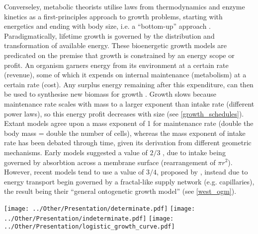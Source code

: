 \documentclass[a4paper]{article} %
\begin{document}
    Converseley, metabolic theorists utilise laws from thermodynamics and enzyme kinetics as a first-principles approach to growth problems, starting with energetics and ending with body size, i.e. a ``bottom-up'' approach \autocite{Brown2004}. Paradigmatically, lifetime growth is governed by the distribution and transformation of available energy. These bioenergetic growth models are predicated on the premise that growth is constrained by an energy scope or profit. An organism garners energy from its environment at a certain rate (revenue), some of which it expends on internal maintenance (metabolism) at a certain rate (cost). Any surplus energy remaining after this expenditure, can then be used to synthesise new biomass for growth \autocite{Holdway1984, Rochet2001}. Growth slows because maintenance rate scales with mass to a larger exponent than intake rate (different power laws), so this energy profit decreases with size (see \cref{growth_schedules}). Extant models agree upon a mass exponent of 1 for maintenance rate (double the body mass = double the number of cells), whereas the mass exponent of intake rate has been debated through time, given its derivation from different geometric mechanisms. Early models suggested a value of $2/3$ \autocite{Putter1920,vonBert1938, VonBertalanffy1957}, due to intake being governed by absorbtion across a membrane surface (rearrangement of $\pi r^2$). However, recent models tend to use a value of $3/4$, proposed by \cite{West1997}, instead due to energy transport begin governed by a fractal-like supply network (e.g. capillaries), the result being their ``general ontogenetic growth model'' (see \cref{west_ogm}).

    \begin{center}
        \begin{minipage}{\linewidth}
        \texttt{[image: ../Other/Presentation/determinate.pdf]}
        \texttt{[image: ../Other/Presentation/indeterminate.pdf]}
        \texttt{[image: ../Other/Presentation/logistic\_growth\_curve.pdf]}  
        \label{growth_schedules}
        \end{minipage}%
    \end{center}
\end{document}
